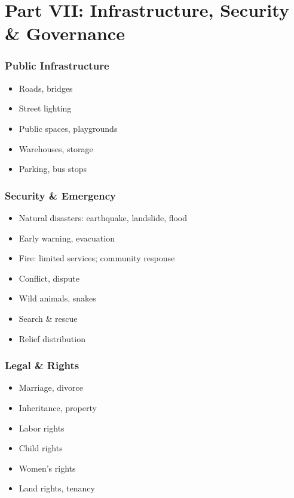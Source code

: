 \documentclass[11pt,a4paper]{article}
\begin{document}
\part{Part VII: Infrastructure, Security \& Governance}

\section{Public Infrastructure}
\begin{itemize}
    \item Roads, bridges
    \item Street lighting
    \item Public spaces, playgrounds
    \item Warehouses, storage
    \item Parking, bus stops
\end{itemize}

\section{Security \& Emergency}

\begin{itemize}
    \item Natural disasters: earthquake, landslide, flood
    \item Early warning, evacuation
    \item Fire: limited services; community response
    \item Conflict, dispute
    \item Wild animals, snakes
    \item Search \& rescue
    \item Relief distribution
\end{itemize}

\section{Legal \& Rights}

\begin{itemize}
    \item Marriage, divorce
    \item Inheritance, property
    \item Labor rights
    \item Child rights
    \item Women's rights
    \item Land rights, tenancy
\end{itemize}
\end{document}
